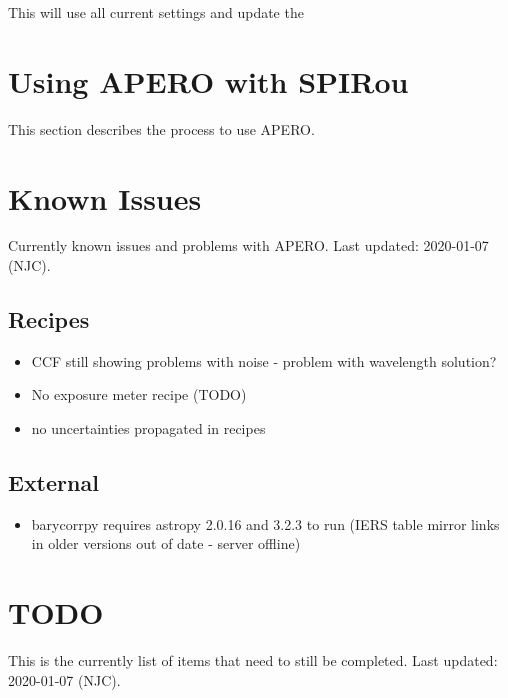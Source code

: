 \documentclass[a4paper,10pt,english]{report}
\begin{document}
This will use all current settings and update the


\section{Using APERO with SPIRou}
\label{\detokenize{user/general/using_apero_default:using-apero-with-spirou}}\label{\detokenize{user/general/using_apero_default:using-apero-default}}\label{\detokenize{user/general/using_apero_default::doc}}
This section describes the process to use APERO.


\section{Known Issues}
\label{\detokenize{user/general/known_issues:known-issues}}\label{\detokenize{user/general/known_issues:id1}}\label{\detokenize{user/general/known_issues::doc}}
Currently known issues and problems with APERO.
Last updated: 2020-01-07 (NJC).


\subsection{Recipes}
\label{\detokenize{user/general/known_issues:recipes}}\begin{itemize}
\item {} 
CCF still showing problems with noise - problem with wavelength solution?

\item {} 
No exposure meter recipe (TODO)

\item {} 
no uncertainties propagated in recipes

\end{itemize}


\subsection{External}
\label{\detokenize{user/general/known_issues:external}}\begin{itemize}
\item {} 
barycorrpy requires astropy 2.0.16 and 3.2.3 to run (IERS table mirror links
in older versions out of date - server offline)

\end{itemize}


\section{TODO}
\label{\detokenize{user/general/todo:todo}}\label{\detokenize{user/general/todo:id1}}\label{\detokenize{user/general/todo::doc}}
This is the currently list of items that need to still be completed.
Last updated: 2020-01-07 (NJC).
\end{document}
